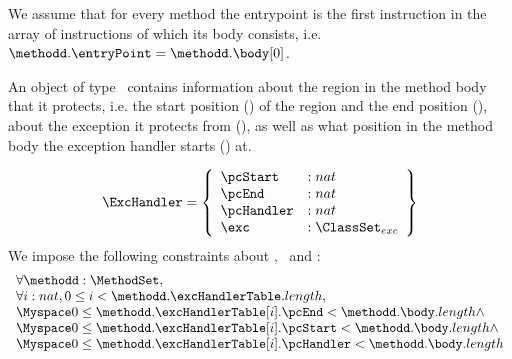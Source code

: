  We assume that for every method \methodd the entrypoint is the first instruction in the array of instructions 
 of which its body consists, i.e. $ \methodd.\entryPoint =\methodd.\body[0]$.

 An object of type \ExcHandler \ contains information about the region in the method body that it protects, i.e. the start
 position (\pcStart) of the region and the end position (\pcEnd), about the exception it protects from (\exc),
 as well as what position in the method body the exception handler starts (\pcHandler) at.


 $$ \begin{array}{l}  
                 \ExcHandler = \left\{\begin{array}{ll} \pcStart & : nat \\
						          \pcEnd & : nat \\
							  \pcHandler &  : nat \\
							  \exc & : \ClassSet_{exc} 
                                        \end{array}  \right\}
     \end{array} $$
   We impose the following constraints about \pcStart, \pcEnd \ and \pcHandler:
$$ \begin{array}{l}  \forall \methodd: \MethodSet,  \\
                      \forall i:nat, 0 \le i <  \methodd.\excHandlerTable.length,  \\
                            \Myspace 0 \le \methodd.\excHandlerTable[i].\pcEnd <  \methodd.\body.length \wedge  \\
			    \Myspace 0 \le \methodd.\excHandlerTable[i].\pcStart <  \methodd.\body.length  \wedge \\
			    \Myspace 0 \le \methodd.\excHandlerTable[i].\pcHandler <  \methodd.\body.length  
    \end{array}
 $$

 
  
